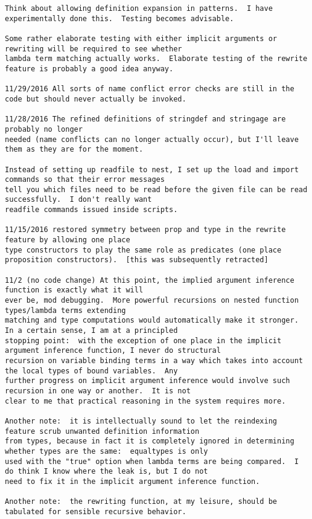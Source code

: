 \documentclass{article}
\begin{document}
{\begin{verbatim}
Think about allowing definition expansion in patterns.  I have experimentally done this.  Testing becomes advisable.

Some rather elaborate testing with either implicit arguments or rewriting will be required to see whether
lambda term matching actually works.  Elaborate testing of the rewrite feature is probably a good idea anyway.

11/29/2016 All sorts of name conflict error checks are still in the code but should never actually be invoked.

11/28/2016 The refined definitions of stringdef and stringage are probably no longer
needed (name conflicts can no longer actually occur), but I'll leave them as they are for the moment.

Instead of setting up readfile to nest, I set up the load and import commands so that their error messages
tell you which files need to be read before the given file can be read successfully.  I don't really want
readfile commands issued inside scripts.

11/15/2016 restored symmetry between prop and type in the rewrite feature by allowing one place
type constructors to play the same role as predicates (one place proposition constructors).  [this was subsequently retracted]

11/2 (no code change) At this point, the implied argument inference function is exactly what it will
ever be, mod debugging.  More powerful recursions on nested function types/lambda terms extending
matching and type computations would automatically make it stronger.  In a certain sense, I am at a principled
stopping point:  with the exception of one place in the implicit argument inference function, I never do structural
recursion on variable binding terms in a way which takes into account the local types of bound variables.  Any 
further progress on implicit argument inference would involve such recursion in one way or another.  It is not
clear to me that practical reasoning in the system requires more.

Another note:  it is intellectually sound to let the reindexing feature scrub unwanted definition information
from types, because in fact it is completely ignored in determining whether types are the same:  equaltypes is only
used with the "true" option when lambda terms are being compared.  I do think I know where the leak is, but I do not
need to fix it in the implicit argument inference function.

Another note:  the rewriting function, at my leisure, should be tabulated for sensible recursive behavior.


\end{verbatim}}
\end{document}
